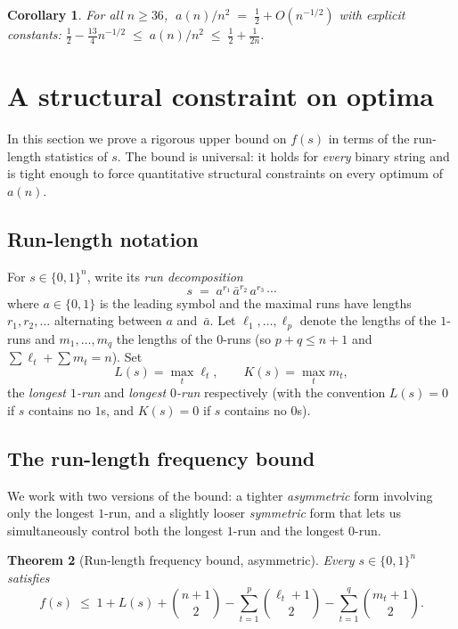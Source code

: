 ﻿\documentclass[11pt,a4paper]{article}
\theoremstyle{plain}
\newtheorem{theorem}{Theorem}
\newtheorem{corollary}[theorem]{Corollary}
\theoremstyle{definition}
\theoremstyle{remark}
\begin{document}
\begin{corollary}\label{cor:rate-sharp}
For all $n\ge 36$, $\;a(n)/n^2\;=\;\tfrac12+O(n^{-1/2})$ with explicit
constants:
\(
  \tfrac12-\tfrac{13}{4}n^{-1/2}\;\le\; a(n)/n^2\;\le\;\tfrac12+\tfrac{1}{2n}.
\)
\end{corollary}

\section{A structural constraint on optima}\label{sec:structure}

In this section we prove a rigorous upper bound on $f(s)$ in terms
of the run-length statistics of $s$.  The bound is universal: it
holds for \emph{every} binary string and is tight enough to force
quantitative structural constraints on every optimum of $a(n)$.

\subsection{Run-length notation}

For $s\in\{0,1\}^n$, write its \emph{run decomposition}
\[
  s\;=\;a^{r_1}\,\bar a^{r_2}\,a^{r_3}\,\cdots
\]
where $a\in\{0,1\}$ is the leading symbol and the maximal runs have
lengths $r_1,r_2,\ldots$ alternating between $a$ and~$\bar a$.  Let
$\ell_1,\ldots,\ell_p$ denote the lengths of the $1$-runs and
$m_1,\ldots,m_q$ the lengths of the $0$-runs (so
$p+q\le n+1$ and $\sum\ell_t+\sum m_t=n$).  Set
\[
  L(s)=\max_t\ell_t,\qquad K(s)=\max_t m_t,
\]
the \emph{longest $1$-run} and \emph{longest $0$-run} respectively
(with the convention $L(s)=0$ if $s$ contains no $1$s, and
$K(s)=0$ if $s$ contains no $0$s).

\subsection{The run-length frequency bound}

We work with two versions of the bound: a tighter \emph{asymmetric}
form involving only the longest $1$-run, and a slightly looser
\emph{symmetric} form that lets us simultaneously control both the
longest $1$-run and the longest $0$-run.

\begin{theorem}[Run-length frequency bound, asymmetric]\label{thm:rlf}
Every $s\in\{0,1\}^n$ satisfies
\begin{equation}\label{eq:rlf}
  f(s)\;\le\;1+L(s)+\binom{n+1}{2}
        -\sum_{t=1}^{p}\binom{\ell_t+1}{2}
        -\sum_{t=1}^{q}\binom{m_t+1}{2}.
\end{equation}
\end{theorem}
\end{document}

